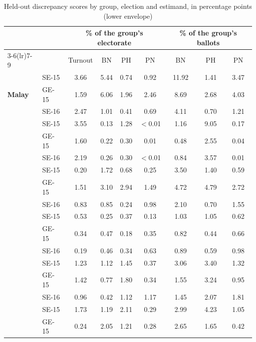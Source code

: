 \begin{table}[!htb]
\caption{Held-out discrepancy scores by group, election and estimand, in percentage points (lower envelope)}
\label{tab:errors}
\centering\footnotesize\setlength{\tabcolsep}{4pt}
\begin{tabular}{ll cccc @{\hspace{6pt}} ccc}
\toprule
 & & \multicolumn{4}{c}{\% of the group's \textbf{electorate}} & \multicolumn{3}{c}{\% of the group's \textbf{ballots}} \\
\cmidrule(lr){3-6}\cmidrule(lr){7-9}
 & & Turnout & BN & PH & PN & BN & PH & PN \\
\midrule
\multirow{3}{*}{\textbf{Malay}} & SE-15 & 3.66 & 5.44 & 0.74 & 0.92 & 11.92 & 1.41 & 3.47 \\
 & GE-15 & 1.59 & 6.06 & 1.96 & 2.46 & 8.69 & 2.68 & 4.03 \\
 & SE-16 & 2.47 & 1.01 & 0.41 & 0.69 & 4.11 & 0.70 & 1.21 \\
\addlinespace[2pt]
\multirow{3}{*}{\textbf{Chinese}} & SE-15 & 3.55 & 0.13 & 1.28 & $<$0.01 & 1.16 & 9.05 & 0.17 \\
 & GE-15 & 1.60 & 0.22 & 0.30 & 0.01 & 0.48 & 2.55 & 0.04 \\
 & SE-16 & 2.19 & 0.26 & 0.30 & $<$0.01 & 0.84 & 3.57 & 0.01 \\
\addlinespace[2pt]
\midrule
\multirow{3}{*}{\textbf{18--29}} & SE-15 & 0.20 & 1.72 & 0.68 & 0.25 & 3.50 & 1.40 & 0.59 \\
 & GE-15 & 1.51 & 3.10 & 2.94 & 1.49 & 4.72 & 4.79 & 2.72 \\
 & SE-16 & 0.83 & 0.85 & 0.24 & 0.98 & 2.10 & 0.70 & 1.55 \\
\addlinespace[2pt]
\multirow{3}{*}{\textbf{30--39}} & SE-15 & 0.53 & 0.25 & 0.37 & 0.13 & 1.03 & 1.05 & 0.62 \\
 & GE-15 & 0.34 & 0.47 & 0.18 & 0.35 & 0.82 & 0.44 & 0.66 \\
 & SE-16 & 0.19 & 0.46 & 0.34 & 0.63 & 0.89 & 0.59 & 0.98 \\
\addlinespace[2pt]
\multirow{3}{*}{\textbf{40--49}} & SE-15 & 1.23 & 1.12 & 1.45 & 0.37 & 3.06 & 3.40 & 1.32 \\
 & GE-15 & 1.42 & 0.77 & 1.80 & 0.34 & 1.55 & 3.24 & 0.95 \\
 & SE-16 & 0.96 & 0.42 & 1.12 & 1.17 & 1.45 & 2.07 & 1.81 \\
\addlinespace[2pt]
\multirow{3}{*}{\textbf{50--59}} & SE-15 & 1.73 & 1.19 & 2.11 & 0.29 & 2.99 & 4.23 & 1.05 \\
 & GE-15 & 0.24 & 2.05 & 1.21 & 0.28 & 2.65 & 1.65 & 0.42 \\

\end{tabular}
\end{table}
